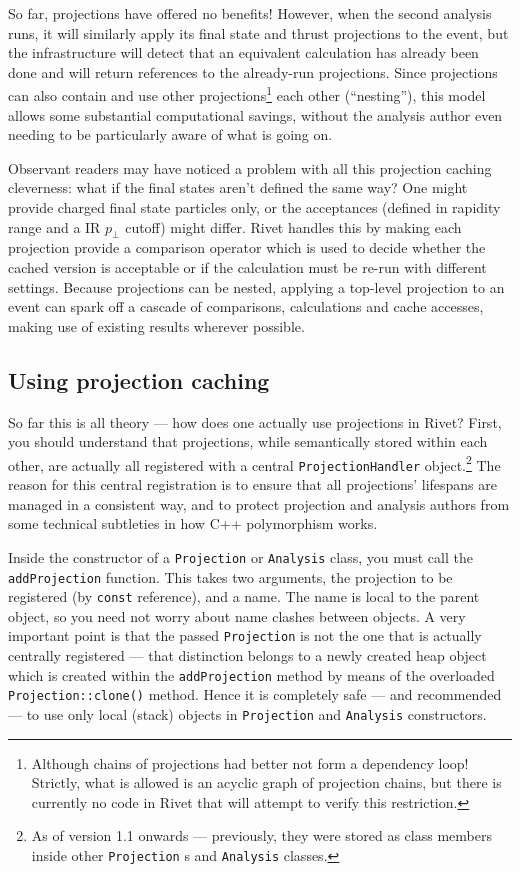 \documentclass{JHEP3}
\newcommand{\code}[1]{\texttt{#1}\xspace}
\newcommand{\pT}{\ensuremath{p_\perp}\xspace}
\begin{document}
So far, projections have offered no benefits! However, when the second analysis
runs, it will similarly apply its final state and thrust projections to the
event, but the infrastructure will detect that an equivalent calculation has
already been done and will return references to the already-run
projections. Since projections can also contain and use other
projections\footnote{Although chains of projections had better not form a
  dependency loop! Strictly, what is allowed is an acyclic graph of projection
  chains, but there is currently no code in Rivet that will attempt to verify
  this restriction.} each other (``nesting''), this model allows some substantial
computational savings, without the analysis author even needing to be
particularly aware of what is going on.

Observant readers may have noticed a problem with all this projection caching
cleverness: what if the final states aren't defined the same way? One might
provide charged final state particles only, or the acceptances (defined in
rapidity range and a IR \pT cutoff) might differ. Rivet handles this by
making each projection provide a comparison operator which is used to decide
whether the cached version is acceptable or if the calculation must be re-run
with different settings. Because projections can be nested, applying a top-level
projection to an event can spark off a cascade of comparisons, calculations and
cache accesses, making use of existing results wherever possible.

\subsection{Using projection caching}
So far this is all theory --- how does one actually use projections in Rivet?
First, you should understand that projections, while semantically stored within
each other, are actually all registered with a central \code{ProjectionHandler}
object.\footnote{As of version 1.1 onwards --- previously, they were stored as
  class members inside other \code{Projection}s and \code{Analysis} classes.}
The reason for this central registration is to ensure that all projections'
lifespans are managed in a consistent way, and to protect projection and
analysis authors from some technical subtleties in how C++ polymorphism works.

Inside the constructor of a \code{Projection} or \code{Analysis} class, you must
call the \code{addProjection} function. This takes two arguments, the projection
to be registered (by \code{const} reference), and a name. The name is local to
the parent object, so you need not worry about name clashes between objects. A
very important point is that the passed \code{Projection} is not the one that is
actually centrally registered --- that distinction belongs to a newly created
heap object which is created within the \code{addProjection} method by means of
the overloaded \code{Projection::clone()} method. Hence it is completely safe
--- and recommended --- to use only local (stack) objects in \code{Projection}
and \code{Analysis} constructors.
\end{document}

